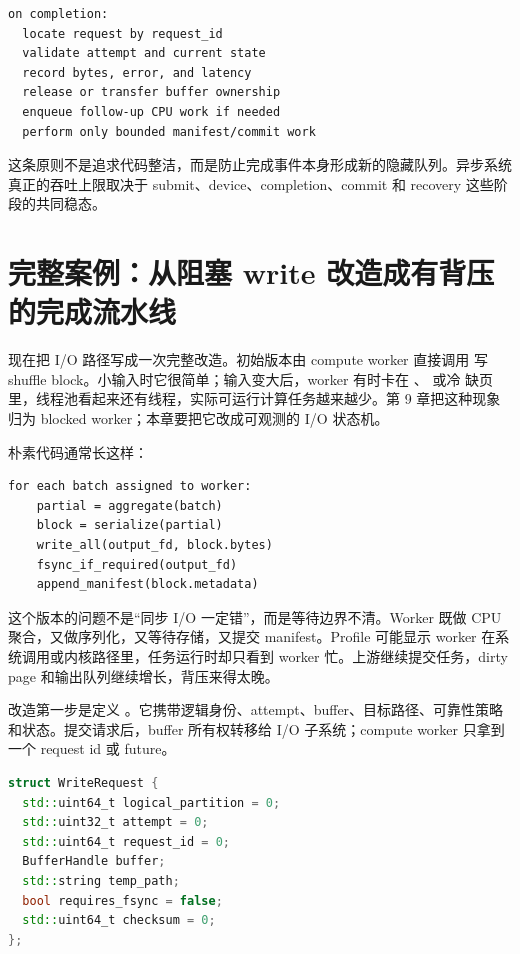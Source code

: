 \begin{lstlisting}[numbers=none,caption={completion loop 的短路径原则}]
on completion:
  locate request by request_id
  validate attempt and current state
  record bytes, error, and latency
  release or transfer buffer ownership
  enqueue follow-up CPU work if needed
  perform only bounded manifest/commit work
\end{lstlisting}

这条原则不是追求代码整洁，而是防止完成事件本身形成新的隐藏队列。异步系统真正的吞吐上限取决于 submit、device、completion、commit 和 recovery 这些阶段的共同稳态。

\section{完整案例：从阻塞 write 改造成有背压的完成流水线}

现在把 I/O 路径写成一次完整改造。初始版本由 compute worker 直接调用  写 shuffle block。小输入时它很简单；输入变大后，worker 有时卡在 、 或冷  缺页里，线程池看起来还有线程，实际可运行计算任务越来越少。第 9 章把这种现象归为 blocked worker；本章要把它改成可观测的 I/O 状态机。

朴素代码通常长这样：

\begin{lstlisting}[numbers=none,caption={阻塞写版本把设备等待放进 worker}]
for each batch assigned to worker:
    partial = aggregate(batch)
    block = serialize(partial)
    write_all(output_fd, block.bytes)
    fsync_if_required(output_fd)
    append_manifest(block.metadata)
\end{lstlisting}

这个版本的问题不是“同步 I/O 一定错”，而是等待边界不清。Worker 既做 CPU 聚合，又做序列化，又等待存储，又提交 manifest。Profile 可能显示 worker 在系统调用或内核路径里，任务运行时却只看到 worker 忙。上游继续提交任务，dirty page 和输出队列继续增长，背压来得太晚。

改造第一步是定义 。它携带逻辑身份、attempt、buffer、目标路径、可靠性策略和状态。提交请求后，buffer 所有权转移给 I/O 子系统；compute worker 只拿到一个 request id 或 future。

\begin{lstlisting}[language=C++,caption={WriteRequest 表达 I/O 状态机输入}]
struct WriteRequest {
  std::uint64_t logical_partition = 0;
  std::uint32_t attempt = 0;
  std::uint64_t request_id = 0;
  BufferHandle buffer;
  std::string temp_path;
  bool requires_fsync = false;
  std::uint64_t checksum = 0;
};
\end{lstlisting}


